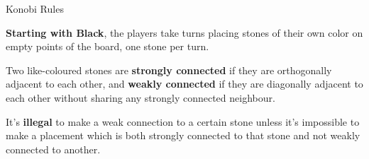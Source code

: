 \documentclass{beamer}
\begin{document}
  \begin{frame}{Konobi Rules}

    \textbf{Starting with Black}, the players take turns placing stones of their own color on empty points of the board, one stone per turn.

    \vspace{1em}

    Two like-coloured stones are \textbf{strongly connected} if they are orthogonally adjacent to each other, and \textbf{weakly connected} if they are diagonally adjacent to each other without sharing any strongly connected neighbour.

    \vspace{1em}

    It's \textbf{illegal} to make a weak connection to a certain stone unless it's impossible to make a placement which is both strongly connected to that stone and not weakly connected to another.

  \end{frame}
\end{document}
